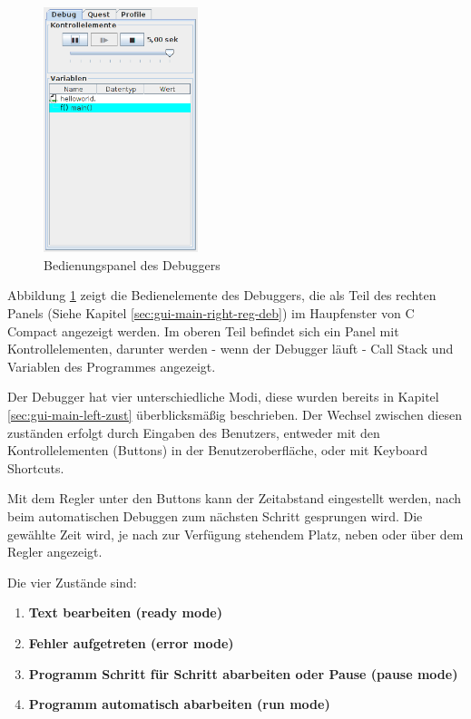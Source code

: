 \begin{figure}[htp]
\centering
\includegraphics[width=0.4\textwidth]{./media/images/gui/debugger/CCompact-guimain-run.png}
\caption{Bedienungspanel des Debuggers}
\label{fig:deb-gui-rpanel}
\end{figure}

Abbildung \ref{fig:deb-gui-rpanel} zeigt die Bedienelemente des Debuggers, die als Teil des rechten Panels (Siehe Kapitel \ref{sec:gui-main-right-reg-deb}) im Haupfenster von C Compact angezeigt werden. Im oberen Teil befindet sich ein Panel mit Kontrollelementen, darunter werden - wenn der Debugger läuft - Call Stack und Variablen des Programmes angezeigt.

Der Debugger hat vier unterschiedliche Modi, diese wurden bereits in Kapitel \ref{sec:gui-main-left-zust} überblicksmäßig beschrieben. Der Wechsel zwischen diesen zuständen erfolgt durch Eingaben des Benutzers, entweder mit den Kontrollelementen (Buttons) in der Benutzeroberfläche, oder mit Keyboard Shortcuts.

Mit dem Regler unter den Buttons kann der Zeitabstand eingestellt werden, nach beim automatischen Debuggen zum nächsten Schritt gesprungen wird. Die gewählte Zeit wird, je nach zur Verfügung stehendem Platz, neben oder über dem Regler angezeigt.

Die vier Zustände sind:
\begin{enumerate}
\item \textbf{Text bearbeiten (ready mode)}
\item \textbf{Fehler aufgetreten (error mode)}
\item \textbf{Programm Schritt für Schritt abarbeiten oder Pause (pause mode)}
\item \textbf{Programm automatisch abarbeiten (run mode)}
\end{enumerate}

